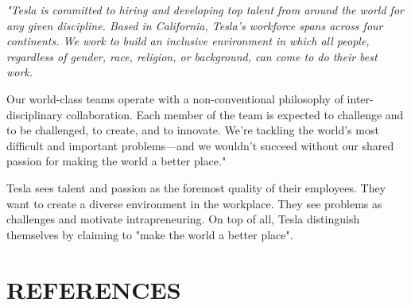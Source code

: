 \documentclass[12pt]{article}
\providecommand\phantomsection{} %
\begin{document}
{\itshape
"Tesla is committed to hiring and developing top talent from around the world for any given discipline. Based in California, Tesla’s workforce spans across four continents. We work to build an inclusive environment in which all people, regardless of gender, race, religion, or background, can come to do their best work.

Our world-class teams operate with a non-conventional philosophy of inter-disciplinary collaboration. Each member of the team is expected to challenge and to be challenged, to create, and to innovate. We’re tackling the world’s most difficult and important problems—and we wouldn’t succeed without our shared passion for making the world a better place."
}

Tesla sees talent and passion as the foremost quality of their employees. They want to create a diverse environment in the workplace. They see problems as challenges and motivate intrapreneuring. On top of all, Tesla distinguish themselves by claiming to "make the world a better place".



\clearpage

\begingroup 
\linespread{1}

\setlength\bibitemsep{\baselineskip}

\setlength{\bibhang}{0pt}

\section*{REFERENCES}
\phantomsection
{}%

\printbibliography[heading=none]
\endgroup
\end{document}
